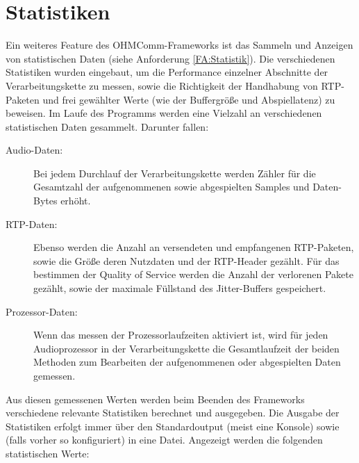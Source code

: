 \section{Statistiken}
Ein weiteres Feature des OHMComm-Frameworks ist das Sammeln und Anzeigen von statistischen Daten (siehe Anforderung \ref{FA:Statistik}). Die verschiedenen Statistiken wurden eingebaut, um die Performance einzelner Abschnitte der Verarbeitungskette zu messen, sowie die Richtigkeit der Handhabung von RTP-Paketen und frei gewählter Werte (wie der Buffergröße und Abspiellatenz) zu beweisen. Im Laufe des Programms werden eine Vielzahl an verschiedenen statistischen Daten gesammelt. Darunter fallen:
\begin{description}
\item[Audio-Daten:] Bei jedem Durchlauf der Verarbeitungskette werden Zähler für die Gesamtzahl der aufgenommenen sowie abgespielten Samples und Daten-Bytes erhöht.
\item[RTP-Daten:] Ebenso werden die Anzahl an versendeten und empfangenen RTP-Paketen, sowie die Größe deren Nutzdaten und der RTP-Header gezählt. Für das bestimmen der Quality of Service werden die Anzahl der verlorenen Pakete gezählt, sowie der maximale Füllstand des Jitter-Buffers gespeichert.
\item[Prozessor-Daten:] Wenn das messen der Prozessorlaufzeiten aktiviert ist, wird für jeden Audioprozessor in der Verarbeitungskette die Gesamtlaufzeit der beiden Methoden zum Bearbeiten der aufgenommenen oder abgespielten Daten gemessen.
\end{description}
Aus diesen gemessenen Werten werden beim Beenden des Frameworks verschiedene relevante Statistiken berechnet und ausgegeben. Die Ausgabe der Statistiken erfolgt immer über den Standardoutput (meist eine Konsole) sowie (falls vorher so konfiguriert) in eine Datei. Angezeigt werden die folgenden statistischen Werte:
